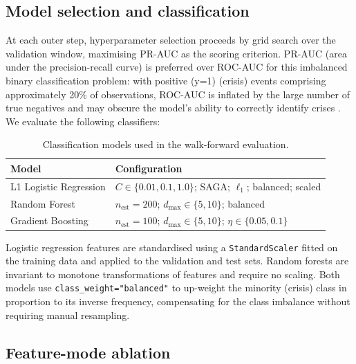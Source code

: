 \documentclass{article}
\begin{document}
\subsection{Model selection and classification}
\label{sec:models}

At each outer step, hyperparameter selection proceeds by grid search over the validation window, maximising PR-AUC as the scoring criterion. PR-AUC (area under the precision-recall curve) is preferred over ROC-AUC for this imbalanced binary classification problem: with positive (y=1) (crisis) events comprising approximately 20\% of observations, ROC-AUC is inflated by the large number of true negatives and may obscure the model's ability to correctly identify crises \cite{davis2006}.\\

We evaluate the following classifiers:

\begin{table}[H]
\centering
\small
\caption{Classification models used in the walk-forward evaluation.}
\label{tab:models}
\begin{tabular}{ll}
\toprule
\textbf{Model} & \textbf{Configuration} \\
\midrule

L1 Logistic Regression
& $C \in \{0.01, 0.1, 1.0\}$; SAGA; $\ell_1$; balanced; scaled \\

Random Forest
& $n_{\text{est}}=200$; $d_{\max}\in\{5,10\}$; balanced \\

Gradient Boosting
& $n_{\text{est}}=100$; $d_{\max}\in\{5,10\}$; $\eta\in\{0.05,0.1\}$ \\

\bottomrule
\end{tabular}
\end{table}

\noindent Logistic regression features are standardised using a \texttt{StandardScaler} fitted on the training data and applied to the validation and test sets. Random forests are invariant to monotone transformations of features and require no scaling. Both models use \texttt{class\_weight="balanced"} to up-weight the minority (crisis) class in proportion to its inverse frequency, compensating for the class imbalance without requiring manual resampling.

\subsection{Feature-mode ablation}
\end{document}
